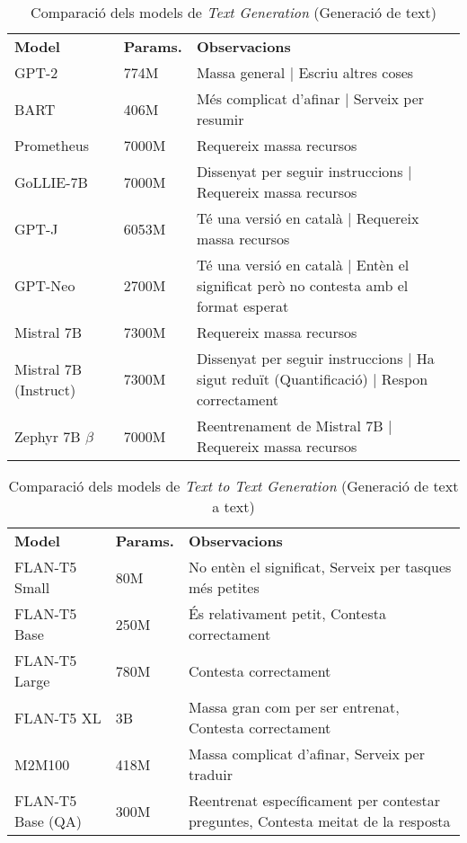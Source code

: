 \begin{table}[H]
  \centering
  \begin{tabular}{|>{\centering}m{2.3cm}|m{1.6cm}|m{10.7cm}|}
    \hline
    \multicolumn{3}{|c|}{\textbf{Models de \textit{Text Generation}}} \\
    \hline
    \textbf{Model} & \textbf{Params.} & \textbf{Observacions} \\
    \hline
    GPT-2 & 774M & Massa general | Escriu altres coses \\
    BART & 406M & Més complicat d'afinar | Serveix per resumir \\
    Prometheus & 7000M & Requereix massa recursos \\
    GoLLIE-7B & 7000M & Dissenyat per seguir instruccions | Requereix massa recursos \\
    GPT-J & 6053M & Té una versió en català | Requereix massa recursos \\
    GPT-Neo & 2700M & Té una versió en català | Entèn el significat però no contesta amb el format esperat \\
    Mistral 7B & 7300M & Requereix massa recursos \\
    Mistral 7B (Instruct) & 7300M & Dissenyat per seguir instruccions | Ha sigut reduït (Quantificació) | Respon correctament \\
    Zephyr 7B $\beta$ & 7000M & Reentrenament de Mistral 7B | Requereix massa recursos \\
    \hline
  \end{tabular}
  \caption{Comparació dels models de \textit{Text Generation} (Generació de text)}
  \label{tab:tg-comparison}
\end{table}

\begin{table}[H]
  \centering
  \begin{tabular}{|>{\centering}m{2.3cm}|m{1.6cm}|m{10.7cm}|}
    \hline
    \multicolumn{3}{|c|}{\textbf{Models de \textit{Text to Text Generation}}} \\
    \hline
    \textbf{Model} & \textbf{Params.} & \textbf{Observacions} \\
    \hline
    FLAN-T5 Small & 80M & No entèn el significat, Serveix per tasques més petites \\
    FLAN-T5 Base & 250M & És relativament petit, Contesta correctament \\
    FLAN-T5 Large & 780M & Contesta correctament \\
    FLAN-T5 XL & 3B & Massa gran com per ser entrenat, Contesta correctament \\
    M2M100 & 418M & Massa complicat d'afinar, Serveix per traduir \\
    FLAN-T5 Base (QA) & 300M & Reentrenat específicament per contestar preguntes, Contesta meitat de la resposta  \\
    \hline
  \end{tabular}
  \caption{Comparació dels models de \textit{Text to Text Generation} (Generació de text a text)}
  \label{tab:t2t-comparison}
\end{table}


